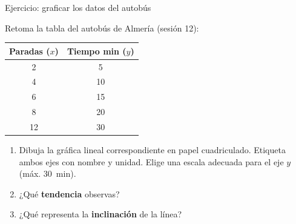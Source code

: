 \documentclass[aspectratio=169, 10pt, spanish]{beamer}
\begin{document}
\begin{frame}{Ejercicio: graficar los datos del autobús}
  \begin{aplicarbox}
    Retoma la tabla del autobús de Almería (sesión 12):

    \vspace{0.2cm}
    \begin{center}
    \AlmFontSmall
    \begin{tabular}{cc}
      \toprule
      \rowcolor{AlmAzul!12}
      \textbf{Paradas (\(x\))} & \textbf{Tiempo min (\(y\))} \\
      \midrule
      2 & 5 \\ \rowcolor{AlmFondo}
      4 & 10 \\
      6 & 15 \\ \rowcolor{AlmFondo}
      8 & 20 \\
      12 & 30 \\
      \bottomrule
    \end{tabular}
    \end{center}

    \vspace{0.2cm}
    \begin{enumerate}
      \item Dibuja la gráfica lineal correspondiente en papel cuadriculado.
            Etiqueta ambos ejes con nombre y unidad.
            Elige una escala adecuada para el eje $y$ (máx. 30~min).
      \item ¿Qué \textbf{tendencia} observas?
      \item ¿Qué representa la \textbf{inclinación} de la línea?
    \end{enumerate}
  \end{aplicarbox}
\end{frame}
\end{document}
